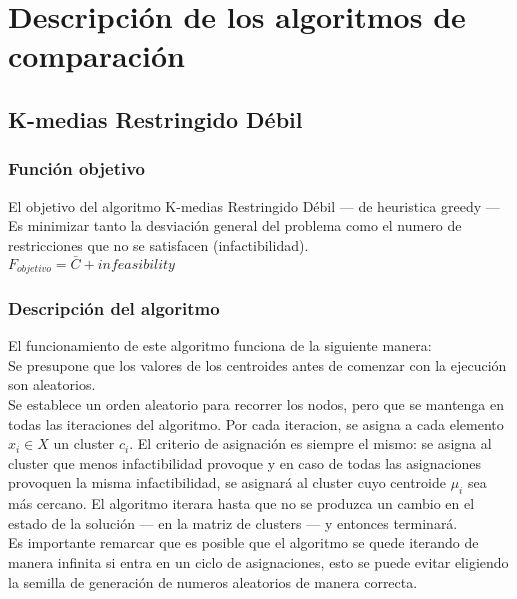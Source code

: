 \chapter{Descripción de los algoritmos de comparación}
\section{K-medias Restringido Débil}
\subsection{Función objetivo}
El objetivo del algoritmo K-medias Restringido Débil --- de heuristica greedy --- Es minimizar tanto la desviación general del problema como el numero de restricciones que no se satisfacen (infactibilidad). \\
$ F_{objetivo} = \bar{C} + infeasibility $

\subsection{Descripción del algoritmo}
El funcionamiento de este algoritmo funciona de la siguiente manera:\\
Se presupone que los valores de los centroides antes de comenzar con la ejecución son aleatorios.\\
Se establece un orden aleatorio para recorrer los nodos, pero que se mantenga en todas las iteraciones del algoritmo. Por cada iteracion, se asigna a cada elemento $ x_{i} \in X $ un cluster $ c_{i} $. El criterio de asignación es siempre el mismo: se asigna al cluster que menos infactibilidad provoque y en caso de todas las asignaciones provoquen la misma infactibilidad, se asignará al cluster cuyo centroide  $ \mu_{i} $ sea más cercano.
El algoritmo iterara hasta que no se produzca un cambio en el estado de la solución --- en la matriz de clusters --- y entonces terminará.\\
Es importante remarcar que es posible que el algoritmo se quede iterando de manera infinita si entra en un ciclo de asignaciones, esto se puede evitar eligiendo la semilla de generación de numeros aleatorios de manera correcta.

